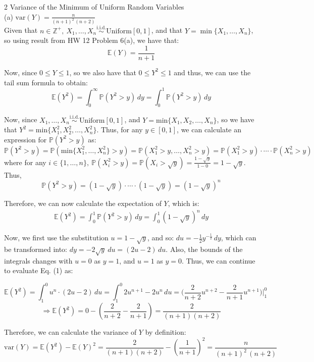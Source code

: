 \documentclass{article}
\begin{document}
{\Large 2 Variance of the Minimum of Uniform Random Variables} \\[.5cm]
{\large{\color{red} (a) $\text{var}(Y) = \frac{n}{(n+1)^2\,(n+2)}$ } } \\

Given that $n\in\mathbb{Z^+},\
X_1,\dots, X_n \stackrel{\text{i.i.d.}}{\sim} \text{Uniform}[0,1]$, and that
$Y = \min\{X_1, \dots, X_n\}$, so using result from HW 12 Problem 6(a), we have that:
$$\mathbb{E}(Y) = \frac{1}{n+1}$$

Now, since $0\leq Y\leq1$, so we also have that $0\leq Y^2\leq 1$ and thus, we can use the tail sum formula to obtain:
$$\mathbb{E}(Y^2) =
	\int_0^\infty \mathbb{P}(Y^2>y)\,dy =
	\int_0^1 \mathbb{P}(Y^2>y)\,dy$$

Now, since $X_1,\dots, X_n \stackrel{\text{i.i.d.}}{\sim} \text{Uniform}[0,1]$,
and $Y = \text{min}\{X_1, X_2, \dots, X_n\}$,
so we have that $Y^2 = \text{min}\{X_1^2, X_2^2, \dots, X_n^2\}$.
Thus, for any $y\in[0,1]$, we can calculate an expression for $\mathbb{P}(Y^2>y)$ as:
$\mathbb{P}(Y^2>y) =
\mathbb{P}(\text{min}\{X_1^2, \dots, X_n^2\}>y) =
\mathbb{P}(X_1^2>y,\dots, X_n^2>y) =
\mathbb{P}(X_1^2>y)\cdot \cdots \cdot\mathbb{P}(X_n^2>y)$
where for any $i\in\{1,\dots, n\},\
\mathbb{P}(X_i^2>y) =
\mathbb{P}(X_i>\sqrt{y}) = 
\frac{1 - \sqrt{y}}{1-0} =
1 - \sqrt{y}$.
Thus,
$$\mathbb{P}(Y^2>y) = (1-\sqrt{y})\cdot\cdots\cdot(1-\sqrt{y}) = (1-\sqrt{y})^n$$

Therefore, we can now calculate the expectation of $Y$, which is:
\begin{align}
\mathbb{E}(Y^2) =
\int_0^1 \mathbb{P}(Y^2>y)\,dy =
\int_0^1 (1-\sqrt{y})^n \,dy
\end{align}

Now, we first use the substitution $u = 1 - \sqrt{y}$, and so:
$du = -\frac{1}{2}y^{-\frac{1}{2}}\, dy$, which can be transformed into:
$dy = -2\sqrt{y}\ du = (2u-2)\, du$. Also, the bounds of the integrals changes with $u = 0$ as $y = 1$, and $u = 1$ as $y = 0$. Thus, we can continue to evaluate Eq. (1) as:

$$
\mathbb{E}(Y^2) =
\int_1^0 u^n \cdot (2u-2)\, du =
\int_1^0 2 u^{n+1} - 2 u^n\, du =
\big(\frac{2}{n+2} u^{n+2} - \frac{2}{n+1} u^{n+1}\big) \Big|_1^0 $$
$$\Longrightarrow \mathbb{E}(Y^2) =
0 - (\frac{2}{n+2} - \frac{2}{n+1}) =
\frac{2}{(n+1)(n+2)} $$

Therefore, we can calculate the variance of $Y$ by definition:
$$\text{var}(Y) = \mathbb{E}(Y^2) - \mathbb{E}(Y)^2 =
\frac{2}{(n+1)(n+2)} - (\frac{1}{n+1})^2 =
\frac{n}{(n+1)^2\,(n+2)}
$$
\end{document}
